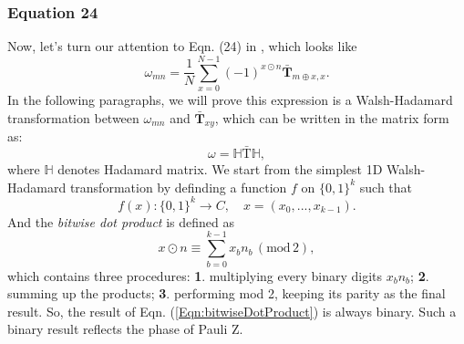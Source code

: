 \subsubsection{Equation 24}
Now, let's turn our attention to Eqn. (24) in \cite{feniou2025realspacechemistryquantumcomputers}, which looks like
\begin{equation}
\omega_{mn}=\frac{1}{N}\sum_{x=0}^{N-1}(-1)^{x\odot n}\bar{\textbf{T}}_{m\oplus x,x}.
\label{Eqn:24}
\end{equation}
 In the following paragraphs, we will prove this expression is a Walsh-Hadamard transformation between $\omega_{mn}$ and $\bar{\textbf{T}}_{xy}$, which can be written in the matrix form as:
\begin{equation}
    \omega=\mathbb{H}\bar{\text{T}}\mathbb{H},
    \label{Eqn:Two-sidedWHT}
\end{equation}
where $\mathbb{H}$ denotes Hadamard matrix. We start from the simplest 1D Walsh-Hadamard transformation by definding a function $f$ on $\{0,1\}^k$ such that 
\begin{equation}
    f(x):\{0,1\}^k\rightarrow C, \quad x=(x_0, ..., x_{k-1}).
\end{equation}
And the \textit{bitwise dot product} is defined as
\begin{equation}
    x\odot n\equiv\sum_{b=0}^{k-1}x_bn_b \, (\text{mod}\, 2),
    \label{Eqn:bitwiseDotProduct}
\end{equation}
which contains three procedures: \textbf{1}. multiplying every binary digits $x_bn_b$; \textbf{2}. summing up the products; \textbf{3}. performing mod 2, keeping its parity as the final result. So, the result of Eqn. (\ref{Eqn:bitwiseDotProduct}) is always binary. Such a binary result reflects the phase of Pauli Z.

